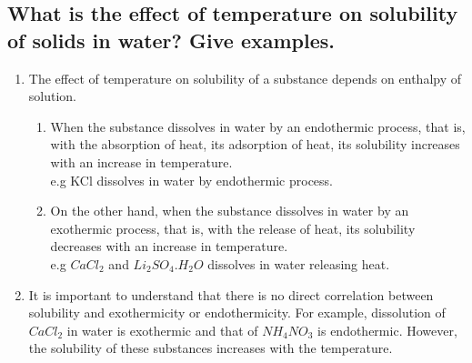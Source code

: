 \documentclass{article}
\begin{document}
   \subsection{What is the effect of temperature on solubility of
   solids in water? Give examples.}
   \begin{enumerate}
	\item The effect of temperature on solubility of a substance
	depends on enthalpy of solution.
	\begin{enumerate}
	    \item When the substance dissolves in water by an 
	    endothermic process, that is, with the absorption of heat,
	    its adsorption of heat, its solubility increases with an
	    increase in temperature.\\
	    e.g KCl dissolves in water by endothermic process.
    	    \item On the other hand, when the substance dissolves in
	    water by an exothermic process, that is, with the release
	    of heat, its solubility decreases with an increase in 
	    temperature.\\
	    e.g $CaCl_2$ and $Li_2SO_4.H_2O$ dissolves in water
	    releasing heat.
	\end{enumerate}
	\item It is important to understand that there is no direct 
	correlation between solubility and exothermicity or 
	endothermicity. For example, dissolution of $CaCl_2$ in water
	is exothermic and that of $NH_4NO_3$ is endothermic. However,
	the solubility of these substances increases with the
	temperature.
   \end{enumerate}
\end{document}
